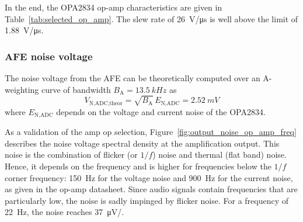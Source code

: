 \documentclass{EPL-master-thesis-covers-EN}
\newcommand{\te}[1]{\textrm{#1}}
\begin{document}

In the end, the OPA2834 op-amp characteristics are given in Table~\ref{tab:selected_op_amp}. The slew rate of \SI{26}{V/\micro s} is well above the limit of \SI{1.88}{V/\micro s}.

\begin{table}[H]
\centering
{}
\caption{Characteristics of the selected operational amplifier: OPA2834}
\label{tab:selected_op_amp}
\end{table}


\subsubsection*{AFE noise voltage}

The noise voltage from the AFE can be theoretically computed over an A-weighting curve of bandwidth $B_\te{A} = \SI{13.5}{kHz}$ as
\[
 V_\te{N,ADC,theor} = \sqrt{B_\te{A}} \, E_\te{N,ADC} = \SI{2.52}{mV}
\]
where $E_\te{N,ADC}$ depends on the voltage and current noise of the OPA2834.

As a validation of the amp op selection, Figure~\ref{fig:output_noise_op_amp_freq} describes the noise voltage spectral density at the amplification output. 
This noise is the combination of flicker (or $1/f$) noise and thermal (flat band) noise. Hence, it depends on the frequency and is higher for frequencies below the $1/f$ corner frequency: \SI{150}{Hz} for the voltage noise and \SI{900}{Hz} for the current noise, as given in the op-amp datasheet. Since audio signals contain frequencies that are particularly low, the noise is sadly impinged by flicker noise. For a frequency of \SI{22}{Hz}, the noise reaches \SI{37}{\micro V/}.
\end{document}
